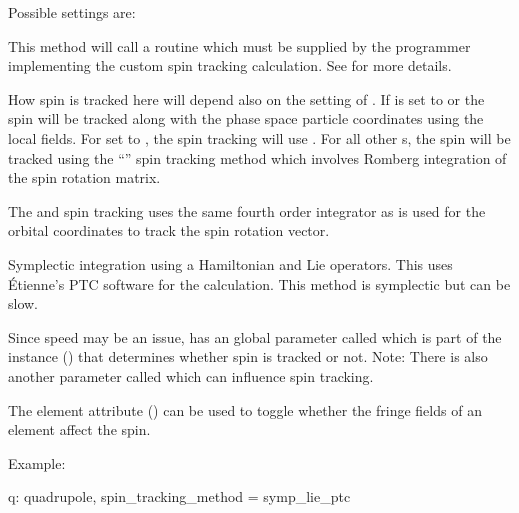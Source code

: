 Possible  settings are:
\begin{description}

\item[\vn{Custom}] \Newline
This method will call a routine  which must be supplied by the programmer
implementing the custom spin tracking calculation. See  for more details.

\item[\vn{Tracking}] \Newline
How spin is tracked here will depend also on the setting of . If
 is set to  or  the spin will be tracked
along with the phase space particle coordinates using the local fields. For  set
to , the spin tracking will use .  For all other s, the
spin will be tracked using the ``'' spin tracking method which involves Romberg
integration of the spin rotation matrix.

The  and  spin tracking uses the same fourth order integrator
as is used for the orbital coordinates to track the spin rotation vector.

\item[\vn{Symp_Lie_PTC}] \Newline
Symplectic integration using a Hamiltonian and Lie operators.  This uses \'Etienne's PTC software
for the calculation.  This method is symplectic but can be slow.

\end{description}

Since speed may be an issue, \bmad has an global parameter called  which is
part of the  instance () that determines whether spin is tracked or
not. Note: There is also another  parameter called 
which can influence spin tracking.

The  element attribute () can be used to toggle whether the
fringe fields of an element affect the spin.

Example:
\begin{example}
  q: quadrupole, spin_tracking_method = symp_lie_ptc
\end{example}


